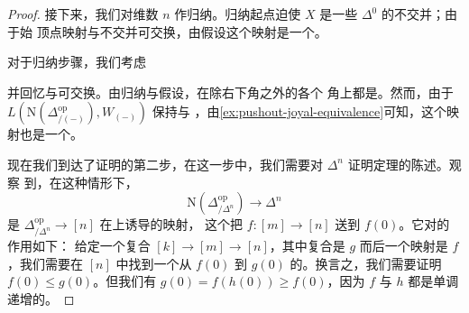 \begin{proof}
接下来，我们对维数 $n$ 作归纳。归纳起点迫使 $X$ 是一些 $\Delta^0$ 的不交并；由于始
顶点映射与不交并可交换，由假设这个映射是一个\trJoyalEquivalence{}。

对于归纳步骤，我们考虑\trPushout{}%
\begin{center}
\end{center}
并回忆\trInitialVertexMap{}与\trColimit{}可交换。由归纳与假设，\trInitialVertexMap{}在除右下角之外的各个
角上都是\trJoyalEquivalence{}。然而，由于\trFunctor{}%
$L(\mathrm{N}(\Delta^{\mathrm{op}}_{/(-)}), W_{(-)})$ 保持\trColimit{}与%
\trMonomorphism{}，由\cref{ex:pushout-joyal-equivalence}可知，这个映射也是一个\trJoyalEquivalence{}。

现在我们到达了证明的第二步，在这一步中，我们需要对 $\Delta^n$ 证明定理的陈述。观察
到，在这种情形下，\trInitialVertexMap{}%
\[
\mathrm{N}(\Delta^{\mathrm{op}}_{/\Delta^n}) \to \Delta^n
\]
是\trFunctor{} $\Delta^{\mathrm{op}}_{/\Delta^n} \to [n]$ 在\trNerve{}上诱导的映射，
这个\trFunctor{}把 $f\colon [m] \to [n]$ 送到 $f(0)$。它对\trMorphism{}的作用如下：
给定一个复合 $[k] \to [m] \to [n]$，其中复合是 $g$ 而后一个映射是 $f$，我们需要在
$[n]$ 中找到一个从 $f(0)$ 到 $g(0)$ 的\trMorphism{}。换言之，我们需要证明
$f(0) \le g(0)$。但我们有 $g(0) = f(h(0)) \ge f(0)$，因为 $f$ 与 $h$ 都是单调递增的。


\end{proof}
